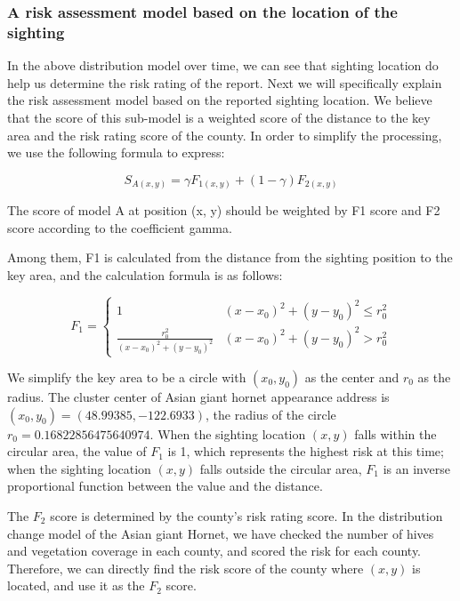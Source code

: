 \documentclass{mcmthesis}
\numberwithin{figure}{section}
\numberwithin{table}{section}
\begin{document}
\subsubsection{A risk assessment model based on the location of the sighting}
In the above distribution model over time, we can see that sighting location do help us determine the risk rating of the report. Next we will specifically explain the risk assessment model based on the reported sighting location. We believe that the score of this sub-model is a weighted score of the distance to the key area and the risk rating score of the county. In order to simplify the processing, we use the following formula to express:

\begin{equation}
    S_{A(x,y)} = \gamma F_{1(x,y)}+ (1-\gamma) F_{2(x,y)}
\end{equation}

The score of model A at position (x, y) should be weighted by F1 score and F2 score according to the coefficient gamma. 

Among them, F1 is calculated from the distance from the sighting position to the key area, and the calculation formula is as follows:

\begin{equation}
  F_1 = \begin{cases}
    1 & (x-x_0)^2 + (y - y_0)^2 \leq r_{0}^2 \\
    \frac{r_{0}^2}{(x-x_0)^2+(y-y_0)^2} & (x-x_0)^2 + (y-y_0)^2 > r_{0}^2

  \end{cases}
\end{equation}

We simplify the key area to be a circle with $(x_0, y_0)$ as the center and $r_0$ as the radius. The cluster center of Asian giant hornet appearance address is $(x_0, y_0)=(48.99385, -122.6933)$, the radius of the circle $r_0=0.16822856475640974$. When the sighting location  $(x, y)$ falls within the circular area, the value of $F_1$ is 1, which represents the highest risk at this time; when the sighting location $(x, y)$ falls outside the circular area, $F_1$ is an inverse proportional function between the value and the distance. 

The $F_2$ score is determined by the county's risk rating score. In the distribution change model of the Asian giant Hornet, we have checked the number of hives and vegetation coverage in each county, and scored the risk for each county. Therefore, we can directly find the risk score of the county where $(x,y)$ is located, and use it as the $F_2$ score. 
\end{document}
